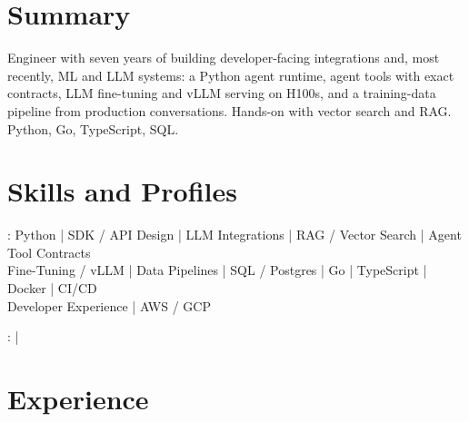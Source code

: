 \documentclass[print]{jack-resume}
\begin{document}
\pagecolor{darkmodeBackground}


\begin{minipage}[t][1cm][t]{.03\textwidth}
    \hfill
\end{minipage}

\section{Summary}
Engineer with seven years of building developer-facing integrations and, most recently, ML and LLM systems: a Python agent runtime, agent tools with exact contracts, LLM fine-tuning and vLLM serving on H100s, and a training-data pipeline from production conversations. Hands-on with vector search and RAG. Python, Go, TypeScript, SQL.
\sectionsep

\section{Skills and Profiles}
:
Python \hfill | \hfill
SDK / API Design \hfill | \hfill
LLM Integrations \hfill | \hfill
RAG / Vector Search \hfill | \hfill
Agent Tool Contracts \\
\hspace{1.0cm} Fine-Tuning / vLLM \hfill | \hfill
Data Pipelines \hfill | \hfill
SQL / Postgres \hfill | \hfill
Go \hfill | \hfill
TypeScript \hfill | \hfill
Docker \hfill | \hfill
CI/CD \\
\hspace{1.0cm} Developer Experience \hfill | \hfill
AWS / GCP \\

\raggedright{
    :
      \href{https://www.linkedin.com/in/jack-sturtevant/}{ \ExternalLink} |
     \href{https://github.com/jacksturt}{ \ExternalLink}}

\section{Experience}
\end{document}
